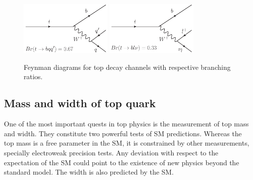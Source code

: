 \begin{figure}[!Hhtbp]
  \begin{center}
    \includegraphics[width=0.4\textwidth]{figs/Top_H_Decay.png}
    \includegraphics[width=0.4\textwidth]{figs/Top_L_Decay.png}
    \caption{Feynman diagrams for top decay channels with respective branching ratios.}
    \label{fig:BRratiosandDecayChannels}
  \end{center}
\end{figure}

%
%
%
%
%
%

\subsection{Mass and width of top quark}

One of the most important quests in top physics is the measurement of top mass and width. They constitute two powerful tests of SM predictions. Whereas the top mass is a free parameter in the SM, it is constrained by other measurements, specially electroweak precision tests. Any deviation with respect to the expectation of the SM could point to the existence of new physics beyond the standard model. The width is also predicted by the SM.%

